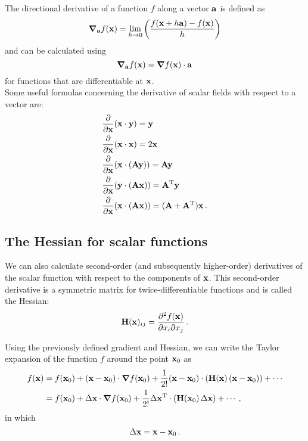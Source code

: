         The directional derivative of a function $f$ along a vector $\vb{a}$ is defined as
        \begin{equation}
            \grad_{\vb{a}} f(\vb{x}) = \lim_{h \to 0} \qty( \frac{f(\vb{x} + h \vb{a}) - f(\vb{x})}{h} )
        \end{equation}
        and can be calculated using
        \begin{equation}
            \grad_{\vb{a}} f(\vb{x}) = \grad{f(\vb{x})} \cdot \vb{a}
        \end{equation}
        for functions that are differentiable at $\vb{x}$. \\

        Some useful formulas concerning the derivative of scalar fields with respect to a vector are:
        \begin{align}
            & \pdv{\vb{x}} (\vb{x} \cdot \vb{y}) = \vb{y} \\
            & \pdv{\vb{x}} (\vb{x} \cdot \vb{x}) = 2 \vb{x} \\
            & \pdv{\vb{x}} (\vb{x} \cdot (\vb{A} \vb{y})) = \vb{A} \vb{y} \\
            & \pdv{\vb{x}} (\vb{y} \cdot (\vb{A} \vb{x})) = \vb{A}^\text{T} \vb{y} \\
            & \pdv{\vb{x}} (\vb{x} \cdot (\vb{A} \vb{x})) = (\vb{A} + \vb{A}^\text{T}) \vb{x} \thinspace .
        \end{align}

    \subsection{The Hessian for scalar functions}
        We can also calculate second-order (and subsequently higher-order) derivatives of the scalar function with respect to the components of $\vb{x}$. This second-order derivative is a symmetric matrix for twice-differentiable functions and is called the Hessian:
        \begin{equation}
            \vb{H}(\vb{x})_{ij} = \pdv{f(\vb{x})}{x_i}{x_j} \thinspace .
        \end{equation}

        Using the previously defined gradient and Hessian, we can write the Taylor expansion of the function $f$ around the point $\vb{x}_0$ as
        \begin{align}
            f(\vb{x}) &= f(\vb{x}_0) + (\vb{x} - \vb{x}_0) \cdot \grad{f(\vb{x}_0)} + \frac{1}{2!} (\vb{x} - \vb{x}_0) \cdot  (\vb{H}(\vb{x}) \thinspace (\vb{x} - \vb{x}_0)) + \cdots \label{eq:taylor_matrix} \\
            &= f(\vb{x}_0) + \Delta \vb{x} \cdot \grad{f(\vb{x}_0)} + \frac{1}{2!} \Delta \vb{x}^\text{T} \cdot (\vb{H}(\vb{x}_0) \thinspace \Delta \vb{x}) + \cdots \thinspace ,
        \end{align}
        in which
        \begin{equation}
            \Delta \vb{x} = \vb{x} - \vb{x}_0 \thinspace .
        \end{equation}

